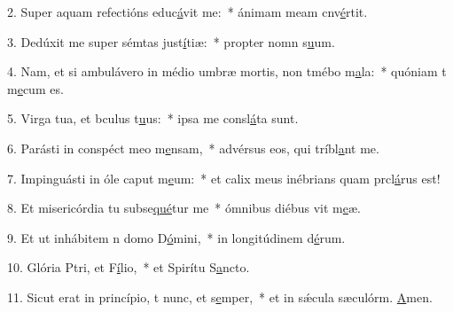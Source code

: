 2. Super aquam refectións educ\uline{á}vit me:~* ánimam meam cnv\uline{é}rtit.\par 
3. Dedúxit me super sémtas just\uline{í}tiæ:~* propter nomn s\uline{u}um.\par 
4. Nam, et si ambulávero in médio umbræ mortis, non tmébo m\uline{a}la:~* quóniam t m\uline{e}cum es.\par 
5. Virga tua, et bculus t\uline{u}us:~* ipsa me consl\uline{á}ta sunt.\par 
6. Parásti in conspéct meo m\uline{e}nsam,~* advérsus eos, qui tríbl\uline{a}nt me.\par 
7. Impinguásti in óle caput m\uline{e}um:~* et calix meus inébrians quam prcl\uline{á}rus est!\par 
8. Et misericórdia tu subse\uline{qué}tur me~* ómnibus diébus vit m\uline{e}æ.\par 
9. Et ut inhábitem n domo D\uline{ó}mini,~* in longitúdinem d\uline{é}rum.\par 
10. Glória Ptri, et F\uline{í}lio,~* et Spirítu S\uline{a}ncto.\par 
11. Sicut erat in princípio, t nunc, et s\uline{e}mper,~* et in sǽcula sæculórm. \uline{A}men.\par 
